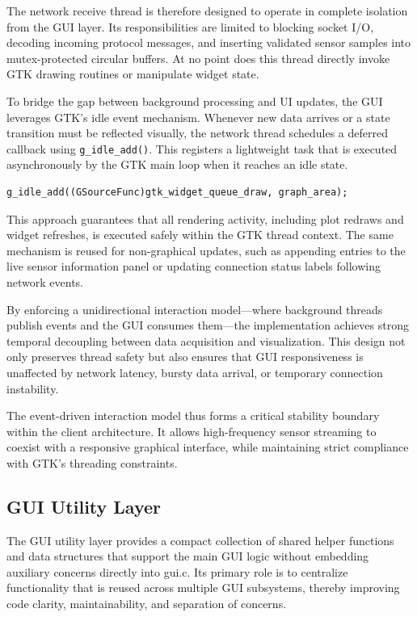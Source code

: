 The network receive thread is therefore designed to operate in complete isolation from the GUI layer. Its responsibilities are limited to blocking socket I/O, decoding incoming protocol messages, and inserting validated sensor samples into mutex-protected circular buffers. At no point does this thread directly invoke GTK drawing routines or manipulate widget state.

To bridge the gap between background processing and UI updates, the GUI leverages GTK’s idle event mechanism. Whenever new data arrives or a state transition must be reflected visually, the network thread schedules a deferred callback using \texttt{g\_idle\_add()}. This registers a lightweight task that is executed asynchronously by the GTK main loop when it reaches an idle state.

\begin{verbatim}
g_idle_add((GSourceFunc)gtk_widget_queue_draw, graph_area);
\end{verbatim}

This approach guarantees that all rendering activity, including plot redraws and widget refreshes, is executed safely within the GTK thread context. The same mechanism is reused for non-graphical updates, such as appending entries to the live sensor information panel or updating connection status labels following network events.

By enforcing a unidirectional interaction model—where background threads publish events and the GUI consumes them—the implementation achieves strong temporal decoupling between data acquisition and visualization. This design not only preserves thread safety but also ensures that GUI responsiveness is unaffected by network latency, bursty data arrival, or temporary connection instability.

The event-driven interaction model thus forms a critical stability boundary within the client architecture. It allows high-frequency sensor streaming to coexist with a responsive graphical interface, while maintaining strict compliance with GTK’s threading constraints.

\subsection{GUI Utility Layer}
The GUI utility layer provides a compact collection of shared helper functions and data structures that support the main GUI logic without embedding auxiliary concerns directly into gui.c. Its primary role is to centralize functionality that is reused across multiple GUI subsystems, thereby improving code clarity, maintainability, and separation of concerns.

